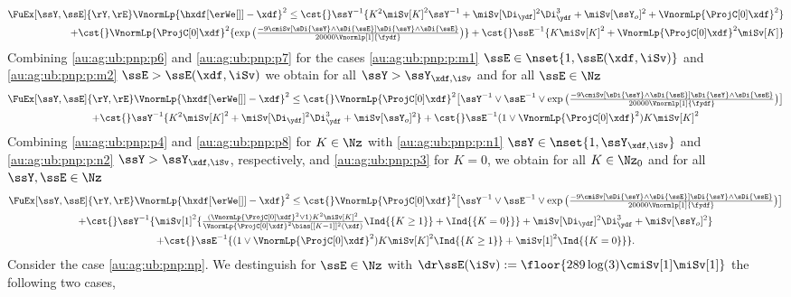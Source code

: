 \begin{pro}
\begin{multline}
  \FuEx[\ssY,\ssE]{\rY,\rE}\VnormLp{\hxdf[{\erWe[]}]-\xdf}^2\leq \cst{}\ssY^{-1}\{K^2\miSv[K]^2\ssY^{-1}+\miSv[\Di_{\ydf}]^2\Di_{\ydf}^3+\miSv[\ssY_{o}]^2+\VnormLp{\ProjC[0]\xdf}^2\}\\\hfill
    +\cst{}\VnormLp{\ProjC[0]\xdf}^2\{
    \exp\big(\tfrac{-9\cmiSv[\sDi{\ssY}\wedge\sDi{\ssE}]\sDi{\ssY}\wedge\sDi{\ssE}}{20000\Vnormlp[1]{\fydf}}\big)\}    +\cst{}\ssE^{-1}\{K\miSv[K]^2+ \VnormLp{\ProjC[0]\xdf}^2\miSv[K]\}
  \end{multline}
Combining \eqref{au:ag:ub:pnp:p6} and \eqref{au:ag:ub:pnp:p7}
for   the cases \ref{au:ag:ub:pnp:p:m1}
$\ssE\in\nset{1,\ssE(\xdf,\iSv)}$ and \ref{au:ag:ub:pnp:p:m2}
$\ssE>\ssE(\xdf,\iSv)$ we obtain for all $\ssY>\ssY_{\xdf,\iSv}$ and for all $\ssE\in\Nz$
\begin{multline}\label{au:ag:ub:pnp:p8}
  \FuEx[\ssY,\ssE]{\rY,\rE}\VnormLp{\hxdf[{\erWe[]}]-\xdf}^2\leq
  \cst{}\VnormLp{\ProjC[0]\xdf}^2\big[\ssY^{-1}\vee \ssE^{-1} \vee\exp\big(\tfrac{-9\cmiSv[\sDi{\ssY}\wedge\sDi{\ssE}]\sDi{\ssY}\wedge\sDi{\ssE}}{20000\Vnormlp[1]{\fydf}}\big)\big]\\
+  \cst{}\ssY^{-1}\{K^2\miSv[K]^2+\miSv[\Di_{\ydf}]^2\Di_{\ydf}^3+\miSv[\ssY_{o}]^2\}
    +\cst{}\ssE^{-1}(1\vee\VnormLp{\ProjC[0]\xdf}^2)K\miSv[K]^2
  \end{multline}
Combining \eqref{au:ag:ub:pnp:p4} and \eqref{au:ag:ub:pnp:p8} for $K\in\Nz$
   with \ref{au:ag:ub:pnp:p:n1}
$\ssY\in\nset{1,\ssY_{\xdf,\iSv}}$ and \ref{au:ag:ub:pnp:p:n2}
$\ssY>\ssY_{\xdf,\iSv}$, respectively, and \eqref{au:ag:ub:pnp:p3}
for $K=0$, we obtain for all $K\in\Nz_0$ and for all $\ssY,\ssE\in\Nz$
\begin{multline}\label{au:ag:ub:pnp:p9}
  \FuEx[\ssY,\ssE]{\rY,\rE}\VnormLp{\hxdf[{\erWe[]}]-\xdf}^2\leq
  \cst{}\VnormLp{\ProjC[0]\xdf}^2\big[\ssY^{-1}\vee \ssE^{-1} \vee\exp\big(\tfrac{-9\cmiSv[\sDi{\ssY}\wedge\sDi{\ssE}]\sDi{\ssY}\wedge\sDi{\ssE}}{20000\Vnormlp[1]{\fydf}}\big)\big]\\
+  \cst{}\ssY^{-1}\{\miSv[1]^2\{\tfrac{(\VnormLp{\ProjC[0]\xdf}^2\vee1)K^2\miSv[K]^2}{\VnormLp{\ProjC[0]\xdf}^2\bias[{[K-1]}]^2(\xdf)}\Ind{\{K\geq1\}}+\Ind{\{K=0\}}\}+\miSv[\Di_{\ydf}]^2\Di_{\ydf}^3+\miSv[\ssY_{o}]^2\}\\
+\cst{}\ssE^{-1}\{(1\vee\VnormLp{\ProjC[0]\xdf}^2)K\miSv[K]^2\Ind{\{K\geq1\}}+\miSv[1]^2\Ind{\{K=0\}}\}.
  \end{multline}
  Consider the case \ref{au:ag:ub:pnp:np}. We destinguish for $\ssE\in\Nz$ with
 $\dr\ssE(\iSv):=\floor{289\log(3)\cmiSv[1]\miSv[1]}$
the following two
cases, \begin{inparaenum}[i]\renewcommand{\theenumi}{\dgrau\rm(\alph{enumi})}\item\label{au:ag:ub:pnp:np:m1}

\end{inparaenum}
\end{pro}
